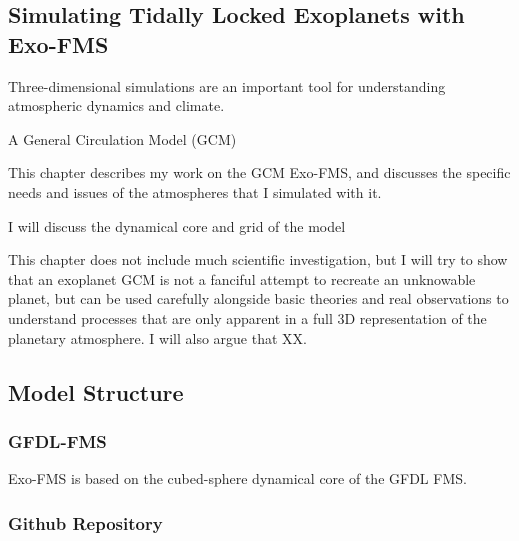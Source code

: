 \begin{SingleSpace}
\chapter{Simulating Tidally Locked Exoplanets with Exo-FMS}\label{ch:sim-exofms}
\vspace{0.5cm}
\end{SingleSpace}
\vspace{0.5cm}





Three-dimensional simulations are an important tool for understanding atmospheric dynamics and climate.

A General Circulation Model (GCM)


This chapter describes my work on the GCM Exo-FMS, and discusses the specific needs and issues of the atmospheres that I simulated with it.

I will discuss the dynamical core and grid of the model

This chapter does not include much scientific investigation, but I will try to show that an exoplanet GCM is not a fanciful attempt to recreate an unknowable planet, but can be used carefully alongside basic theories and real observations to understand processes that are only apparent in a full 3D representation of the planetary atmosphere. I will also argue that XX.

\section{Model Structure}

\subsection*{GFDL-FMS}

Exo-FMS is based on the cubed-sphere dynamical core of the GFDL FMS.


\subsection*{Github Repository}

